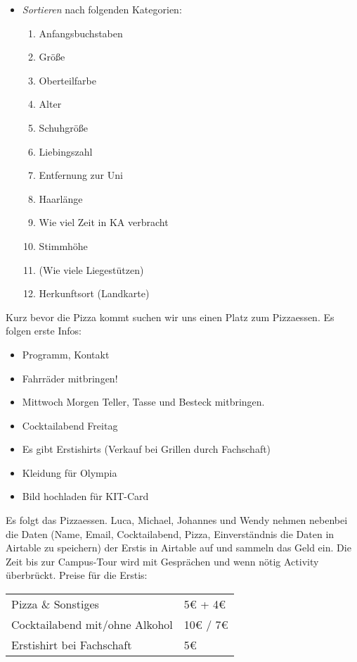 \documentclass[10pt,twocolumn,ngerman]{scrartcl}
\providecommand{\tabularnewline}{\\}
\begin{document}
\begin{itemize}
    \item \emph{Sortieren} nach folgenden Kategorien:
        \begin{enumerate}
            \item Anfangsbuchstaben
            \item Größe
            \item Oberteilfarbe
            \item Alter
            \item Schuhgröße
            \item Liebingszahl
            \item Entfernung zur Uni
            \item Haarlänge
            \item Wie viel Zeit in KA verbracht
            \item Stimmhöhe
            \item (Wie viele Liegestützen)
            \item Herkunftsort (Landkarte)
        \end{enumerate}
\end{itemize}

Kurz bevor die Pizza kommt suchen wir uns einen Platz zum Pizzaessen.
Es folgen erste Infos:
\begin{itemize}
\item Programm, Kontakt
\item Fahrräder mitbringen!
\item Mittwoch Morgen Teller, Tasse und Besteck mitbringen.
\item Cocktailabend Freitag
\item Es gibt Erstishirts (Verkauf bei Grillen durch Fachschaft)
\item Kleidung für Olympia
\item Bild hochladen für KIT-Card
\end{itemize}
Es folgt das Pizzaessen. Luca, Michael, Johannes und Wendy nehmen
nebenbei die Daten (Name, Email, Cocktailabend, Pizza, Einverständnis
die Daten in Airtable zu speichern) der Erstis in Airtable auf und
sammeln das Geld ein. Die Zeit bis zur Campus-Tour wird mit Gesprächen
und wenn nötig Activity überbrückt. Preise für die Erstis:

\medskip{}

\begin{tabular}{ll}
Pizza \& Sonstiges & 5€ + 4€\tabularnewline
Cocktailabend mit/ohne Alkohol & 10€ / 7€\tabularnewline
Erstishirt bei Fachschaft & 5€\tabularnewline
\end{tabular}
\end{document}
